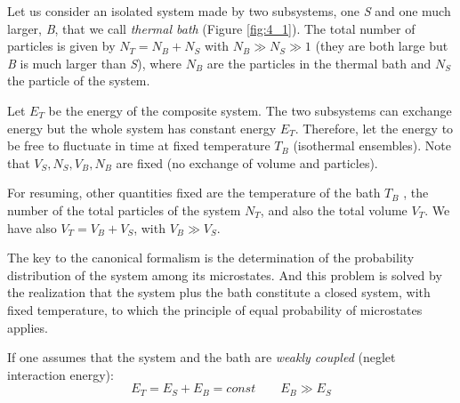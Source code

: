 \documentclass[../main/main.tex]{subfiles}
\begin{document}
Let us consider an isolated system made by two subsystems, one \emph{S} and one much larger, \emph{B}, that we call \emph{thermal bath} (Figure \ref{fig:4_1}). The total number of particles is given by \( N_T = N_B + N_S\)  with \( N_B \gg N_S \gg 1 \) (they are both large but \emph{B} is much larger than \emph{S}), where \( N_B \) are the particles in the thermal bath and \( N_S \) the particle of the system.

Let \( E_T \) be the energy of the composite system. The two subsystems can exchange energy but the whole system has constant energy  \( E_T \). Therefore, let the energy to be free to fluctuate in time at fixed temperature  \( T_B \) (isothermal ensembles).
Note that \( V_S,N_S,V_B,N_B \) are fixed (no exchange of volume and particles).

For resuming, other quantities fixed are the temperature of the bath \( T_B \) , the number of the total particles of the system \( N_T \), and also the total volume \( V_T \).
 We have also \( V_T = V_B + V_S \), with   \( V_B \gg V_S \).

The key to the canonical formalism is the determination of the probability distribution of the system among its microstates. And this problem is solved by the realization that the system plus the bath constitute a closed system, with fixed temperature, to which the principle of equal probability of microstates applies.

If one assumes that the system and the bath are \emph{weakly coupled} (neglet interaction energy):
\begin{equation*}
  E_T = E_S + E_B = const \qquad E_B \gg E_S
\end{equation*}
\end{document}
